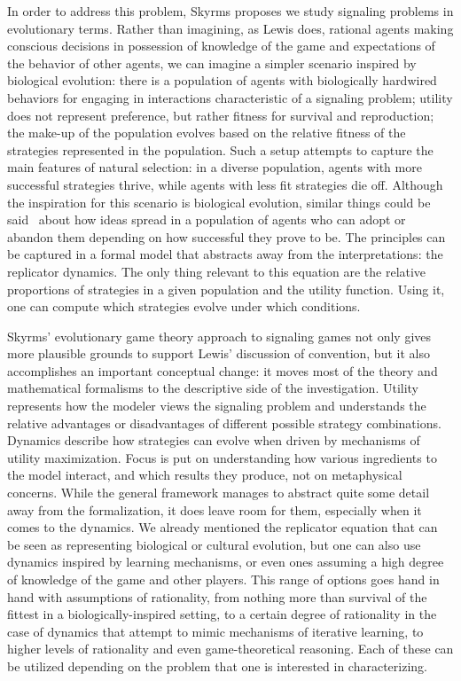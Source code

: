 \documentclass[a4paper]{article}
\begin{document}
In order to address this problem, Skyrms proposes we study signaling problems in evolutionary terms.
Rather than imagining, as Lewis does, rational agents making conscious decisions in possession of knowledge of the game and expectations of the behavior of other agents, we can imagine a simpler scenario inspired by biological evolution: there is a population of agents with biologically hardwired behaviors for engaging in interactions characteristic of a signaling problem; utility does not represent preference, but rather fitness for survival and reproduction; the make-up of the population evolves based on the relative fitness of the strategies represented in the population.
Such a setup attempts to capture the main features of natural selection: in a diverse population, agents with more successful strategies thrive, while agents with less fit strategies die off.
Although the inspiration for this scenario is biological evolution, similar things could be said~\parencite[\emph{e.g.}][]{dawkins_selfish_1978,boyd_culture_1985} about how ideas spread in a population of agents who can adopt or abandon them depending on how successful they prove to be.
The principles can be captured in a formal model that abstracts away from the interpretations: the replicator dynamics.
The only thing relevant to this equation are the relative proportions of strategies in a given population and the utility function.
Using it, one can compute which strategies evolve under which conditions.

Skyrms' evolutionary game theory approach to signaling games not only gives more plausible grounds to support Lewis' discussion of convention, but it also accomplishes an important conceptual change: it moves most of the theory and mathematical formalisms to the descriptive side of the investigation.
Utility represents how the modeler views the signaling problem and understands the relative advantages or disadvantages of different possible strategy combinations.
Dynamics describe how strategies can evolve when driven by mechanisms of utility maximization.
Focus is put on understanding how various ingredients to the model interact, and which results they produce, not on metaphysical concerns.
While the general framework manages to abstract quite some detail away from the formalization, it does leave room for them, especially when it comes to the dynamics.
We already mentioned the replicator equation that can be seen as representing biological or cultural evolution, but one can also use dynamics inspired by learning mechanisms, or even ones assuming a high degree of knowledge of the game and other players.
This range of options goes hand in hand with assumptions of rationality, from nothing more than survival of the fittest in a biologically-inspired setting, to a certain degree of rationality in the case of dynamics that attempt to mimic mechanisms of iterative learning, to higher levels of rationality and even game-theoretical reasoning.
Each of these can be utilized depending on the problem that one is interested in characterizing.
\end{document}
